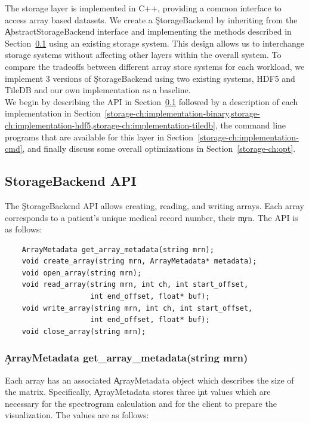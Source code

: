The storage layer is implemented in C++, providing a common interface to access
array based datasets. We create a \c{StorageBackend} by inheriting from the
\c{AbstractStorageBackend} interface and implementing the methods described in
Section~\ref{storage-ch:api} using an existing storage system. This design
allows us to interchange storage systems without affecting other layers within
the overall system. To compare the tradeoffs between different array store
systems for each workload, we implement 3 versions of \c{StorageBackend} using
two existing systems, HDF5 \cite{hdf5} and TileDB \cite{tiledb} and our own
implementation as a baseline. \\

We begin by describing the API in Section~\ref{storage-ch:api} followed by a
description of each implementation in
Section~\cref{storage-ch:implementation-binary,storage-ch:implementation-hdf5,storage-ch:implementation-tiledb},
the command line programs that are available for this layer in
Section~\ref{storage-ch:implementation-cmd}, and finally discuss some overall
optimizations in Section~\ref{storage-ch:opt}.

\subsection{StorageBackend API}\label{storage-ch:api}

The \c{StorageBackend} API allows creating, reading, and writing arrays. Each
array corresponds to a patient's unique medical record number, their \c{mrn}.
The API is as follows:

\begin{lstlisting}
    ArrayMetadata get_array_metadata(string mrn);
    void create_array(string mrn, ArrayMetadata* metadata);
    void open_array(string mrn);
    void read_array(string mrn, int ch, int start_offset,
                    int end_offset, float* buf);
    void write_array(string mrn, int ch, int start_offset,
                    int end_offset, float* buf);
    void close_array(string mrn);
\end{lstlisting}

\subsubsection{\c{ArrayMetadata get\_array\_metadata(string mrn)}}

Each array has an associated \c{ArrayMetadata} object which describes the size
of the matrix. Specifically, \c{ArrayMetadata} stores three \c{int} values which
are necessary for the spectrogram calculation and for the client to prepare the
visualization. The values are as follows:

